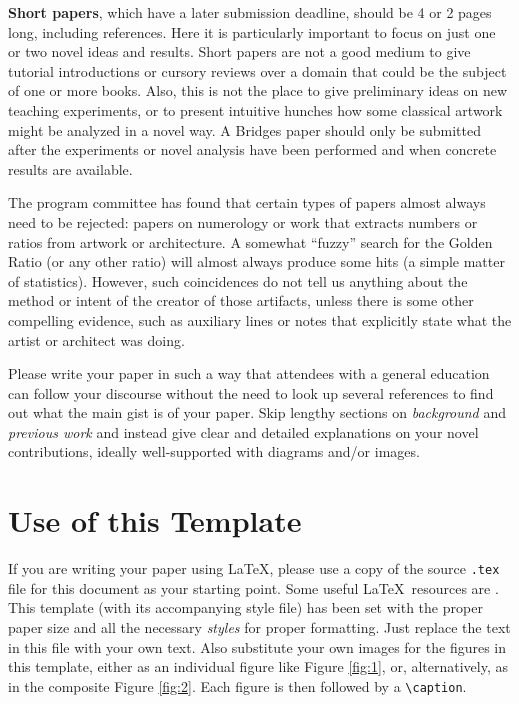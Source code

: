 \documentclass[letterpaper,11pt]{article}
\begin{document}
\textbf{Short papers}, which have a later submission deadline, should be
4 or 2 pages long, including references. Here it is particularly important to focus 
on just one or two novel ideas and results. Short papers are not a good medium
to give tutorial introductions or cursory reviews over a domain that could be the 
subject of one or more books. Also, this is not the place to give preliminary ideas 
on new teaching experiments, or to present intuitive hunches how some classical 
artwork might be analyzed in a novel way. A Bridges paper should only be submitted 
after the experiments or novel analysis have been performed and when concrete results are available.

The program committee has found that certain types of papers almost always 
need to be rejected: papers on numerology or work that extracts numbers or 
ratios from artwork or architecture. A somewhat ``fuzzy'' search for the Golden 
Ratio (or any other ratio) will almost always produce some hits (a simple matter of 
statistics). However, such coincidences do not tell us anything about the method 
or intent of the creator of those artifacts, unless there is some other
compelling evidence, such as auxiliary lines or notes that explicitly
state what the artist or architect was doing.

Please write your paper in such a way that attendees with a general
education can follow your discourse without the need to look up several
references to find out what the main gist is of your paper. Skip lengthy
sections on \emph{background} and \emph{previous work} and instead give
clear and detailed explanations on your novel contributions, ideally
well-supported with diagrams and/or images.


\section*{Use of this Template}

\noindent If you are writing your paper using \LaTeX, please use a
copy of the source \texttt{.tex} file for this document as your starting point. Some 
useful \LaTeX\ resources are \cite{Chang, Gratzer}. This template (with its accompanying 
style file) has been set with the proper paper size and all the necessary \emph{styles} for
proper formatting. Just replace the text in this file with your own text. Also substitute 
your own images for the figures in this template, either as an individual figure like 
Figure \ref{fig:1}, or, alternatively, as in the composite Figure \ref{fig:2}. Each figure is then 
followed by a \verb|\caption|.
\end{document}
